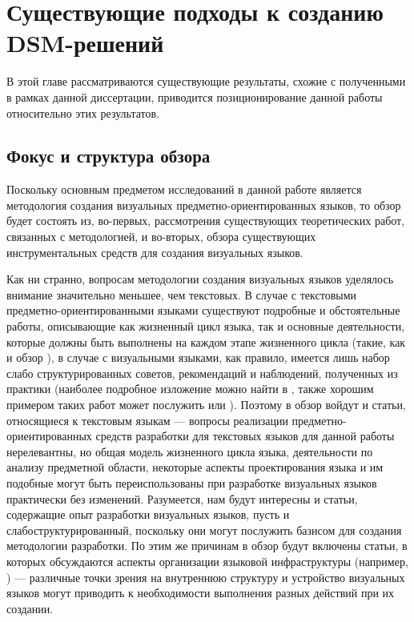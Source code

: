 \chapter{Существующие подходы к созданию DSM-решений}
В этой главе рассматриваются существующие результаты, схожие с полученными в рамках 
данной диссертации, приводится позиционирование данной работы относительно этих результатов.

\section{Фокус и структура обзора}
Поскольку основным предметом исследований в данной работе является методология создания 
визуальных предметно-ориентированных языков, то обзор будет состоять из, во-первых, 
рассмотрения существующих теоретических работ, связанных с методологией, и во-вторых, 
обзора существующих инструментальных средств для создания визуальных языков.

Как ни странно, вопросам методологии создания визуальных языков уделялось внимание 
значительно меньшее, чем текстовых. В случае с текстовыми предметно-ориентированными
языками существуют подробные и обстоятельные работы, описывающие как жизненный цикл
языка, так и основные деятельности, которые должны быть выполнены на каждом этапе
жизненного цикла (такие, как \cite{mernik2005and} и обзор \cite{van2000domain}), в 
случае с визуальными языками, как правило, имеется лишь набор слабо структурированных
советов, рекомендаций и наблюдений, полученных из практики (наиболее подробное изложение 
можно найти в \cite{kelly2008domain}, также хорошим примером таких работ может послужить 
\cite{voelter2009best} или \cite{luoma2004defining}). Поэтому в обзор войдут и статьи, 
относящиеся к текстовым языкам --– вопросы реализации предметно-ориентированных средств 
разработки для текстовых языков для данной работы нерелевантны, но общая модель жизненного 
цикла языка, деятельности по анализу предметной области, некоторые аспекты проектирования 
языка и им подобные могут быть переиспользованы при разработке визуальных языков практически 
без изменений. Разумеется, нам будут интересны и статьи, содержащие опыт разработки 
визуальных языков, пусть и слабоструктурированный, поскольку они могут послужить базисом 
для создания методологии разработки. По этим же причинам в обзор будут включены статьи, 
в которых обсуждаются аспекты организации языковой инфраструктуры (например, \cite{atkinson2003model}) 
--– различные точки зрения на внутреннюю структуру и устройство визуальных языков 
могут приводить к необходимости выполнения разных действий при их создании.

